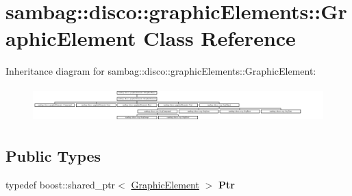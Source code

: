 \hypertarget{classsambag_1_1disco_1_1graphic_elements_1_1_graphic_element}{
\section{sambag::disco::graphicElements::GraphicElement Class Reference}
\label{classsambag_1_1disco_1_1graphic_elements_1_1_graphic_element}
}
Inheritance diagram for sambag::disco::graphicElements::GraphicElement:\begin{figure}[H]
\begin{center}
\leavevmode
\includegraphics[height=1.365188cm]{classsambag_1_1disco_1_1graphic_elements_1_1_graphic_element}
\end{center}
\end{figure}
\subsection*{Public Types}
\begin{DoxyCompactItemize}
\item 
\hypertarget{classsambag_1_1disco_1_1graphic_elements_1_1_graphic_element_aaf40beb610d9ba8709007873c30fd4ed}{
typedef boost::shared\_\-ptr$<$ \hyperlink{classsambag_1_1disco_1_1graphic_elements_1_1_graphic_element}{GraphicElement} $>$ {\bfseries Ptr}}
\label{classsambag_1_1disco_1_1graphic_elements_1_1_graphic_element_aaf40beb610d9ba8709007873c30fd4ed}

\end{DoxyCompactItemize}
